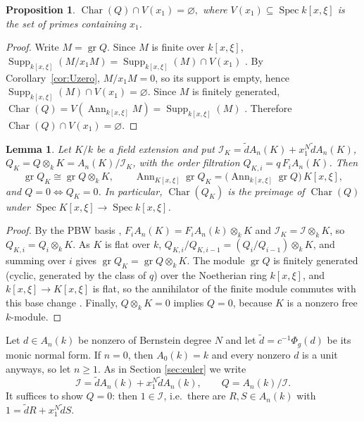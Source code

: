 \documentclass[pdflatex,sn-mathphys-num]{sn-jnl}
\numberwithin{equation}{section}
\theoremstyle{thmstyleone}
\newtheorem{proposition}[theorem]{Proposition}
\newtheorem{lemma}[theorem]{Lemma}
\theoremstyle{thmstyletwo}
\newcommand{\Char}{\operatorname{Char}}
\newcommand{\gr}{\operatorname{gr}}
\newcommand{\Ann}{\operatorname{Ann}}
\newcommand{\Spec}{\operatorname{Spec}}
\newcommand{\Supp}{\operatorname{Supp}}
\begin{document}
\begin{proposition}\label{prop:char-avoids}
$\Char(Q)\cap V(x_1)=\varnothing,$
where $V(x_1)\subseteq \Spec k[x, \xi]$ is the set of primes containing $x_1$.
\end{proposition}
\begin{proof}
Write $M=\gr Q$. Since $M$ is finite over $k[x,\xi]$,
$\Supp_{k[x,\xi]}(M/x_1M)=\Supp_{k[x,\xi]}(M)\cap V(x_1)$ \cite[Tag~00L3]{Stacks}. By Corollary~\ref{cor:Uzero},
$M/x_1M=0$, so its support is empty, hence $\Supp_{k[x,\xi]}(M)\cap V(x_1)=\varnothing$.
Since $M$ is finitely generated, $\Char(Q)=V(\Ann_{k[x,\xi]}M)=\Supp_{k[x,\xi]}(M)$
\cite[Tag~00L2]{Stacks}. Therefore $\Char(Q)\cap V(x_1)=\varnothing$.
\end{proof}




\begin{lemma}\label{lem:base-change}
Let $K/k$ be a field extension and put
$\mathcal I_K=\tilde dA_n(K)+x_1^N\tilde dA_n(K)$, $Q_K=Q\otimes_kK=A_n(K)/\mathcal I_K$, with the
order filtration $Q_{K,i}=q\,F_iA_n(K)$. Then
\[
 \gr Q_K\cong\gr Q\otimes_kK,\qquad
 \Ann_{K[x,\xi]}\gr Q_K=\bigl(\Ann_{k[x,\xi]}\gr Q\bigr)\,K[x,\xi],
\]
and $Q=0\iff Q_K=0$. In particular, $\Char(Q_K)$ is the preimage of $\Char(Q)$
under $\Spec K[x,\xi]\to\Spec k[x,\xi]$.
\end{lemma}
\begin{proof}
By the PBW basis \cite[Prop 1.2.1]{coutinho}, $F_iA_n(K)=F_iA_n(k)\otimes_kK$ and $\mathcal I_K=\mathcal I\otimes_kK$, so
$Q_{K,i}=Q_i\otimes_kK$. As $K$ is flat over $k$,
$Q_{K,i}/Q_{K,i-1}=(Q_i/Q_{i-1})\otimes_kK$, and summing over $i$ gives
$\gr Q_K=\gr Q\otimes_kK$. The module $\gr Q$ is finitely generated (cyclic,
generated by the class of $q$) over the Noetherian ring $k[x,\xi]$, and
$k[x,\xi]\to K[x,\xi]$ is flat, so the annihilator of the finite module
commutes with this base change \cite[Tag~07T8]{Stacks}. Finally, $Q\otimes_kK=0$
implies $Q=0$, because $K$ is a nonzero free $k$-module.
\end{proof}

Let $d\in A_n(k)$ be nonzero of Bernstein degree $N$ and let
$\tilde d=c^{-1}\Phi_g(d)$ be its monic normal form. If $n=0$, then $A_0(k)=k$ and every nonzero $d$ is
a unit anyways, so let $n\ge1$. As in Section \ref{sec:euler} we write
\[ \mathcal I=\tilde dA_n(k)+x_1^N\tilde dA_n(k),\qquad Q=A_n(k)/\mathcal I .\]
It suffices to show $Q=0$: then $1\in \mathcal I$, i.e.\ there are
$R,S\in A_n(k)$ with $1=\tilde dR+x_1^N\tilde dS$.
\end{document}
